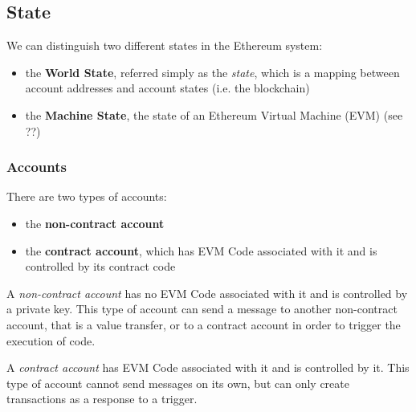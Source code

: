 \subsection{State}

We can distinguish two different states in the Ethereum system:

\begin{itemize}
  \item the \textbf{World State}, referred simply as the \emph{state}, which is
  a mapping between account addresses and account states (i.e. the blockchain)
  \item the \textbf{Machine State}, the state of an Ethereum Virtual Machine
  (EVM) (see ??)
\end{itemize}

\subsubsection{Accounts}

There are two types of accounts:

\begin{itemize}
  \item the \textbf{non-contract account}
  \item the \textbf{contract account}, which has EVM Code associated with it and
  is controlled by its contract code
\end{itemize}

A \emph{non-contract account} has no EVM Code associated with it and is
controlled by a private key. This type of account can send a message to another
non-contract account, that is a value transfer, or to a contract account in
order to trigger the execution of code.

A \emph{contract account} has EVM Code associated with it and is controlled by
it. This type of account cannot send messages on its own, but can only create
transactions as a response to a trigger.